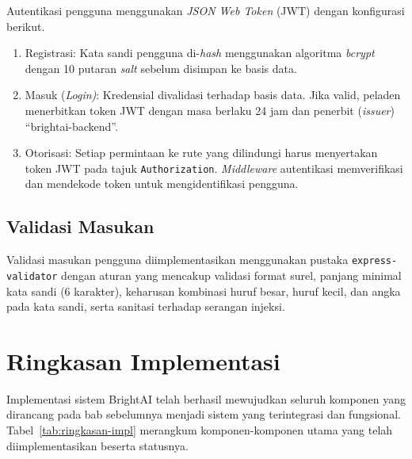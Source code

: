 Autentikasi pengguna menggunakan \textit{JSON Web Token} (JWT)\label{abbr:JWT} dengan konfigurasi berikut.

\begin{enumerate}
    \item Registrasi: Kata sandi pengguna di-\textit{hash} menggunakan algoritma \textit{bcrypt} dengan 10 putaran \textit{salt} sebelum disimpan ke basis data.
    \item Masuk (\textit{Login)}: Kredensial divalidasi terhadap basis data. Jika valid, peladen menerbitkan token JWT dengan masa berlaku 24 jam dan penerbit (\textit{issuer}) ``brightai-backend''.
    \item Otorisasi: Setiap permintaan ke rute yang dilindungi harus menyertakan token JWT pada tajuk \texttt{Authorization}. \textit{Middleware} autentikasi memverifikasi dan mendekode token untuk mengidentifikasi pengguna.
\end{enumerate}

\subsection{Validasi Masukan}

Validasi masukan pengguna diimplementasikan menggunakan pustaka \texttt{express-}\allowbreak\texttt{validator} dengan aturan yang mencakup validasi format surel, panjang minimal kata sandi (6 karakter), keharusan kombinasi huruf besar, huruf kecil, dan angka pada kata sandi, serta sanitasi terhadap serangan injeksi.

\section{Ringkasan Implementasi}
\label{sec:ringkasan-implementasi}

Implementasi sistem BrightAI telah berhasil mewujudkan seluruh komponen yang dirancang pada bab sebelumnya menjadi sistem yang terintegrasi dan fungsional. Tabel~\ref{tab:ringkasan-impl} merangkum komponen-komponen utama yang telah diimplementasikan beserta statusnya.

